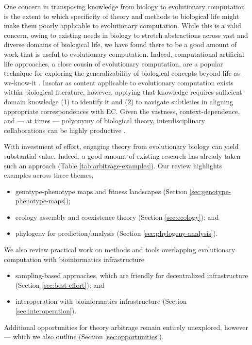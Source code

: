 One concern in transposing knowledge from biology to evolutionary computation is the extent to which specificity of theory and methods to biological life might make them poorly applicable to evolutionary computation.
While this is a valid concern, owing to existing needs in biology to stretch abstractions across vast and diverse domains of biological life, we have found there to be a good amount of work that is useful to evolutionary computation.
Indeed, computational artificial life approaches, a close cousin of evolutionary computation, are a popular technique for exploring the generalizability of biological concepts beyond life-as-we-know-it \citep{cleland2013general,langton1989artificial,pennock2007models}. %
Insofar as content applicable to evolutionary computation exists within biological literature, however, applying that knowledge requires sufficient domain knowledge (1) to identify it and (2) to navigate subtleties in aligning appropriate correspondences with EC.
Given the vastness, context-dependence, and --- at times --- polyonymy of biological theory, interdisciplinary collaborations can be highly productive \citep{goodman2020evolution}.

With investment of effort, engaging theory from evolutionary biology can yield substantial value.
Indeed, a good amount of existing research has already taken such an approach (Table \ref{tab:arbitrage-examples}).
Our review highlights examples across three themes,
\begin{itemize}
  \item genotype-phenotype maps and fitness landscapes (Section \ref{sec:genotype-phenotype-maps});
  \item ecology assembly and coexistence theory (Section \ref{sec:ecology}); and
  \item phylogeny for prediction/analysis (Section \ref{sec:phylogeny-analysis}).
\end{itemize}
We also review practical work on methods and tools overlapping evolutionary computation with bioinformatics infrastructure
\begin{itemize}
  \item sampling-based approaches, which are friendly for decentralized infrastructure (Section \ref{sec:best-effort}); and
  \item interoperation with bioinformatics infrastructure (Section \ref{sec:interoperation}).
\end{itemize}
Additional opportunities for theory arbitrage remain entirely unexplored, however --- which we also outline (Section \ref{sec:opportunities}).

